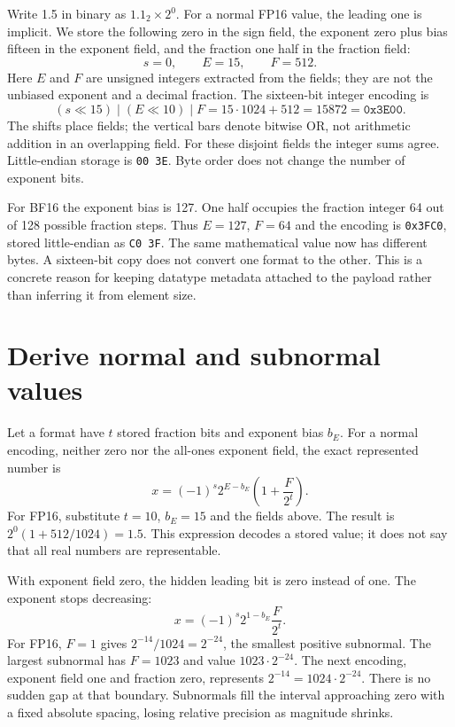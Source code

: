 Write 1.5 in binary as $1.1_2\times2^0$. For a normal FP16 value, the
leading one is implicit. We store the following zero in the sign field,
the exponent zero plus bias fifteen in the exponent field, and the
fraction one half in the fraction field:
\[
 s=0,\qquad E=15,\qquad F=512.
\]
Here $E$ and $F$ are unsigned integers extracted from the fields;
they are not the unbiased exponent and a decimal fraction. The
sixteen-bit integer encoding is
\[
 (s\ll15)\;|\;(E\ll10)\;|\;F
 =15\cdot1024+512=15872=\texttt{0x3E00}.
\]
The shifts place fields; the vertical bars denote bitwise OR, not
arithmetic addition in an overlapping field. For these disjoint fields
the integer sums agree. Little-endian storage is \texttt{00 3E}.
Byte order does not change the number of exponent bits.

For BF16 the exponent bias is 127. One half occupies the fraction
integer 64 out of 128 possible fraction steps. Thus $E=127$, $F=64$
and the encoding is \texttt{0x3FC0}, stored little-endian as
\texttt{C0 3F}. The same mathematical value now has different bytes.
A sixteen-bit copy does not convert one format to the other.
This is a concrete reason for keeping datatype metadata attached
to the payload rather than inferring it from element size.


\section{Derive normal and subnormal values}
Let a format have $t$ stored fraction bits and exponent bias $b_E$.
For a normal encoding, neither zero nor the all-ones exponent field,
the exact represented number is
\begin{equation}
 x=(-1)^s 2^{E-b_E}\left(1+\frac{F}{2^t}\right).
 \label{eq:foundation-normal-bits}
\end{equation}
For FP16, substitute $t=10$, $b_E=15$ and the fields above.
The result is $2^0(1+512/1024)=1.5$. This expression decodes a
stored value; it does not say that all real numbers are representable.

With exponent field zero, the hidden leading bit is zero instead
of one. The exponent stops decreasing:
\begin{equation}
 x=(-1)^s 2^{1-b_E}\frac{F}{2^t}.
 \label{eq:foundation-subnormal-bits}
\end{equation}
For FP16, $F=1$ gives $2^{-14}/1024=2^{-24}$, the smallest
positive subnormal. The largest subnormal has $F=1023$ and value
$1023\cdot2^{-24}$. The next encoding, exponent field one and fraction
zero, represents $2^{-14}=1024\cdot2^{-24}$. There is no sudden
gap at that boundary. Subnormals fill the interval approaching zero
with a fixed absolute spacing, losing relative precision as magnitude
shrinks.

